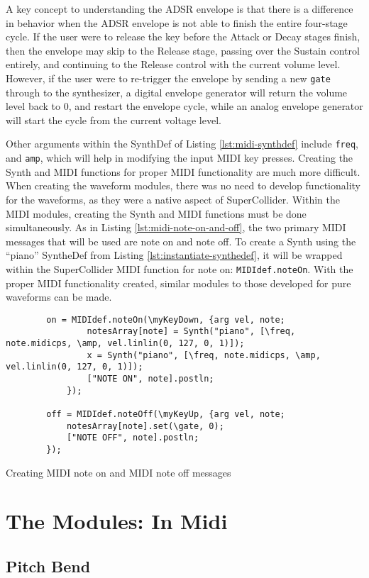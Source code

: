 A key concept to understanding the ADSR envelope is that there is a difference in behavior when the ADSR envelope is not able to finish the entire four-stage cycle. If the user were to release the key before the Attack or Decay stages finish, then the envelope may skip to the Release stage, passing over the Sustain control entirely, and continuing to the Release control with the current volume level. However, if the user were to re-trigger the envelope by sending a new \texttt{gate} through to the synthesizer, a digital envelope generator will return the volume level back to 0, and restart the envelope cycle, while an analog envelope generator will start the cycle from the current voltage level.

Other arguments within the SynthDef of Listing \ref{lst:midi-synthdef} include \texttt{freq}, and \texttt{amp}, which will help in modifying the input MIDI key presses. Creating the Synth and MIDI functions for proper MIDI functionality are much more difficult. When creating the waveform modules, there was no need to develop functionality for the waveforms, as they were a native aspect of SuperCollider. Within the MIDI modules, creating the Synth and MIDI functions must be done simultaneously. As in Listing \ref{lst:midi-note-on-and-off}, the two primary MIDI messages that will be used are note on and note off. To create a Synth using the ``piano'' SyntheDef from Listing \ref{lst:instantiate-synthedef}, it will be wrapped within the SuperCollider MIDI function for note on: \texttt{MIDIdef.noteOn}. With the proper MIDI functionality created, similar modules to those developed for pure waveforms can be made.

\begin{listing}
	\begin{lstlisting}
		on = MIDIdef.noteOn(\myKeyDown, {arg vel, note;
				notesArray[note] = Synth("piano", [\freq, note.midicps, \amp, vel.linlin(0, 127, 0, 1)]);
				x = Synth("piano", [\freq, note.midicps, \amp, vel.linlin(0, 127, 0, 1)]);
				["NOTE ON", note].postln;
			});

		off = MIDIdef.noteOff(\myKeyUp, {arg vel, note;
			notesArray[note].set(\gate, 0);
			["NOTE OFF", note].postln;
		});
	\end{lstlisting}
	\caption{Creating MIDI note on and MIDI note off messages}
	\label{lst:midi-note-on-and-off}	
\end{listing}


\section{The Modules: In Midi}\label{section:the-modules-midi}

\subsection{Pitch Bend}